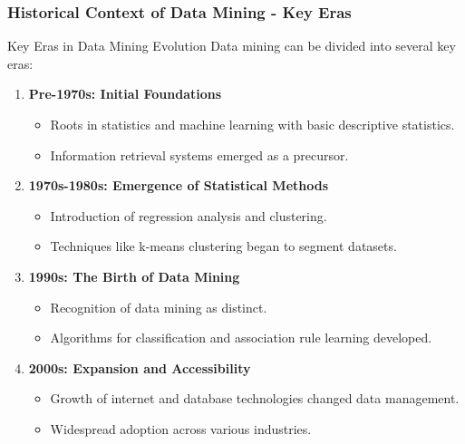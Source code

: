 \documentclass[aspectratio=169]{beamer}
\begin{document}
\begin{frame}[fragile]
    \frametitle{Historical Context of Data Mining - Key Eras}
    \begin{block}{Key Eras in Data Mining Evolution}
        Data mining can be divided into several key eras:
    \end{block}
    \begin{enumerate}
        \item \textbf{Pre-1970s: Initial Foundations}
            \begin{itemize}
                \item Roots in statistics and machine learning with basic descriptive statistics.
                \item Information retrieval systems emerged as a precursor.
            \end{itemize}
        \item \textbf{1970s-1980s: Emergence of Statistical Methods}
            \begin{itemize}
                \item Introduction of regression analysis and clustering.
                \item Techniques like k-means clustering began to segment datasets.
            \end{itemize}
        \item \textbf{1990s: The Birth of Data Mining}
            \begin{itemize}
                \item Recognition of data mining as distinct.
                \item Algorithms for classification and association rule learning developed.
            \end{itemize}
        \item \textbf{2000s: Expansion and Accessibility}
            \begin{itemize}
                \item Growth of internet and database technologies changed data management.
                \item Widespread adoption across various industries.
            \end{itemize}
    \end{enumerate}
\end{frame}
\end{document}
